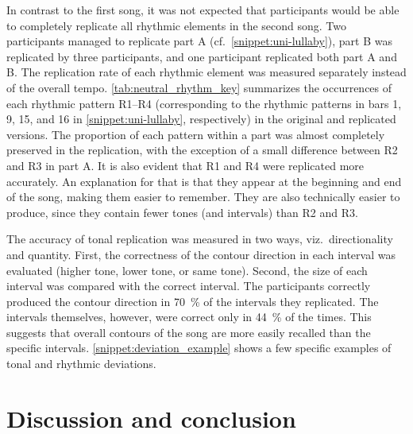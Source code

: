 In contrast to the first song, it was not expected that participants would be able to completely replicate all rhythmic elements in the second song.
Two participants managed to replicate part A (cf.\ \cref{snippet:uni-lullaby}), part B was replicated by three participants, and one participant replicated both part A and B.
The replication rate of each rhythmic element was measured separately instead of the overall tempo.
\cref{tab:neutral_rhythm_key} summarizes the occurrences of each rhythmic pattern R1--R4 (corresponding to the rhythmic patterns in bars 1, 9, 15, and 16 in \cref{snippet:uni-lullaby}, respectively) in the original and replicated versions.
The proportion of each pattern within a part was almost completely preserved in the replication, with the exception of a small difference between R2 and R3 in part A.
It is also evident that R1 and R4 were replicated more accurately.
An explanation for that is that they appear at the beginning and end of the song, making them easier to remember.
They are also technically easier to produce, since they contain fewer tones (and intervals) than R2 and R3.

The accuracy of tonal replication was measured in two ways, viz.\ directionality and quantity.
First, the correctness of the contour direction in each interval was evaluated (higher tone, lower tone, or same tone).
Second, the size of each interval was compared with the correct interval.
The participants correctly produced the contour direction in \SI{70}{\percent} of the intervals they replicated.
The intervals themselves, however, were correct only in \SI{44}{\percent} of the times.
This suggests that overall contours of the song are more easily recalled than the specific intervals.
\cref{snippet:deviation_example} shows a few specific examples of tonal and rhythmic deviations.

\section{Discussion and conclusion}
\label{sec:discussion_and_conclusion}

